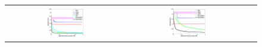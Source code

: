 \documentclass[]{article}
\newcommand{\nnn}{0.33}
\newcommand{\nnh}{0.23}
\begin{document}
\begin{figure}[t!]
\vspace{-0mm}
\begin{center}
\begin{tabular}{ccc}
   \hspace{-5mm} \includegraphics[width=\nnn\textwidth, height=\nnh\textwidth]{plotsx/conductancex/err-vs-time__param10-shaded.pdf} 
& \hspace{-3mm} \includegraphics[width=\nnn\textwidth, height=\nnh\textwidth]{plotsx/conductancex/err-vs-time__param30-shaded.pdf} 

\end{tabular}
\end{center}
\end{figure}
\end{document}
